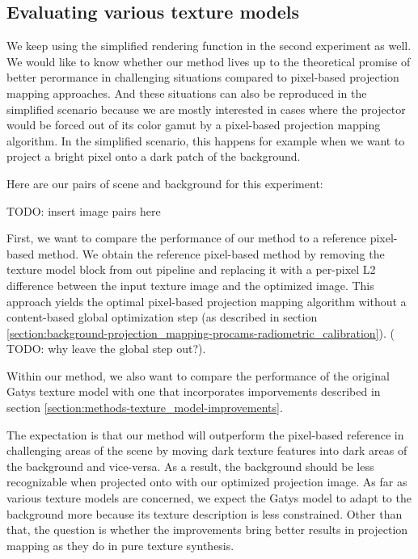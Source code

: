 \subsection{Evaluating various texture models}
\label{section:methods-experiments-02}

We keep using the simplified rendering function in the second experiment as well. We would like to know whether our method lives up to the theoretical promise of better perormance in challenging situations compared to pixel-based projection mapping approaches. And these situations can also be reproduced in the simplified scenario because we are mostly interested in cases where the projector would be forced out of its color gamut by a pixel-based projection mapping algorithm. In the simplified scenario, this happens for example when we want to project a bright pixel onto a dark patch of the background.

Here are our pairs of scene and background for this experiment:

{\color{red} TODO: insert image pairs here}

First, we want to compare the performance of our method to a reference pixel-based method. We obtain the reference pixel-based method by removing the texture model block from out pipeline and replacing it with a per-pixel L2 difference between the input texture image and the optimized image. This approach yields the optimal pixel-based projection mapping algorithm without a content-based global optimization step (as described in section \ref{section:background-projection_mapping-procams-radiometric_calibration}). ({\color{red} TODO: why leave the global step out?}).

Within our method, we also want to compare the performance of the original Gatys texture model with one that incorporates imporvements described in section \ref{section:methods-texture_model-improvements}.

The expectation is that our method will outperform the pixel-based reference in challenging areas of the scene by moving dark texture features into dark areas of the background and vice-versa. As a result, the background should be less recognizable when projected onto with our optimized projection image. As far as various texture models are concerned, we expect the Gatys model to adapt to the background more because its texture description is less constrained. Other than that, the question is whether the improvements bring better results in projection mapping as they do in pure texture synthesis.

